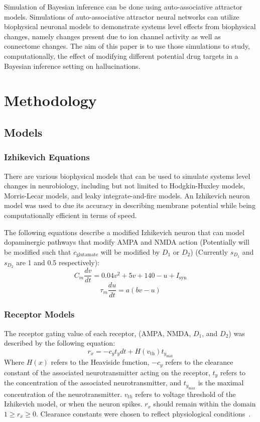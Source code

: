 \documentclass[twocolumn]{article}
\begin{document}
Simulation of Bayesian inference can be done using auto-associative attractor models. Simulations of auto-associative attractor neural networks can utilize biophysical neuronal models to demonstrate systems level effects from biophysical changes, namely changes present due to ion channel activity as well as connectome changes. The aim of this paper is to use those simulations to study, computationally, the effect of modifying different potential drug targets in a Bayesian inference setting on hallucinations.

\section{Methodology}
\subsection{Models}
\subsubsection{Izhikevich Equations}

There are various biophysical models that can be used to simulate systems level changes in neurobiology, including but not limited to Hodgkin-Huxley models, Morris-Lecar models, and leaky integrate-and-fire models. 
An Izhikevich neuron model was used to due its accuracy in describing membrane potential while being computationally efficient in terms of speed.

The following equations describe a modified Izhikevich neuron that can model dopaminergic pathways that modify AMPA and NMDA action 
(Potentially will be modified such that $c_{\mathrm{glutamate}}$ will be modified by $D_1$ or $D_2$) 
(Currently $s_{D_1}$ and $s_{D_2}$ are 1 and 0.5 respectively):
\begin{equation*}
    C_m \frac{dv}{dt} = 0.04 v^2 + 5 v + 140 - u + I_{\mathrm{syn}}
\end{equation*}
\begin{equation*}
    \tau_m \frac{du}{dt} = a (b v - u)
\end{equation*}

\subsubsection{Receptor Models}

The receptor gating value of each receptor, (AMPA, NMDA, $D_1$, and $D_2$) was described by the following equation:
\begin{equation*}
    r_x = -c_y t_y dt + H(v_{\mathrm{th}}) t_{y_{\max}}
\end{equation*}
Where $H(x)$ refers to the Heaviside function, $-c_y$ refers to the clearance constant of the associated neurotransmitter acting on the receptor, $t_y$ refers to the concentration of the associated neurotransmitter, and $t_{y_{\max}}$ is the maximal concentration of the neurotransmitter. 
$v_{th}$ refers to voltage threshold of the Izhikevich model, or when the neuron spikes.
$r_x$ should remain within the domain $1 \geq r_x \geq 0$.
Clearance constants were chosen to reflect physiological conditions~\cite{lippert2019time, moussawi2011extracellular}.
\end{document}
